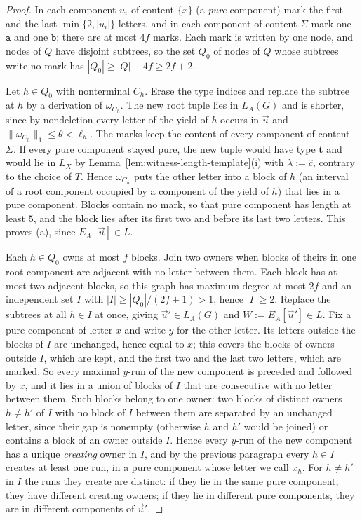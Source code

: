\documentclass[11pt]{article}
\numberwithin{equation}{section}
\theoremstyle{plain}
\theoremstyle{definition}
\theoremstyle{remark}
\newcommand{\tuple}[1]{\vec{#1}}
\theoremstyle{plain}
\begin{document}
\begin{proof}
In each component $u_i$ of content $\{x\}$ (a \emph{pure} component) mark the
first and the last $\min\{2,|u_i|\}$ letters, and in each component of content
$\Sigma$ mark one $\mathtt a$ and one $\mathtt b$; there are at most $4f$ marks.
Each mark is written by one node, and nodes of $Q$ have disjoint subtrees, so
the set $Q_0$ of nodes of $Q$ whose subtrees write no mark has
$|Q_0|\ge|Q|-4f\ge2f+2$.

Let $h\in Q_0$ with nonterminal $C_h$.  Erase the type indices and replace the
subtree at $h$ by a derivation of $\omega_{C_h}$.  The new root tuple lies in
$L_A(G)$ and is shorter, since by nondeletion every letter of the yield of $h$
occurs in $\tuple u$ and $\|\omega_{C_h}\|_1\le\theta<\ell_h$.  The marks keep the
content of every component of content $\Sigma$.  If every pure component stayed
pure, the new tuple would have type $\mathbf t$ and would lie in $L_X$ by
Lemma~\ref{lem:witness-length-template}(i) with $\lambda:=\widehat c$, contrary to
the choice of $T$.  Hence $\omega_{C_h}$ puts the other letter into a block of $h$
(an interval of a root component occupied by a component of the yield of $h$)
that lies in a pure component.  Blocks contain no mark, so that pure component
has length at least $5$, and the block lies after its first two and before its
last two letters.  This proves (a), since $E_A[\tuple u]\in L$.

Each $h\in Q_0$ owns at most $f$ blocks.  Join two owners when blocks of theirs in
one root component are adjacent with no letter between them.  Each block has at
most two adjacent blocks, so this graph has maximum degree at most $2f$ and an
independent set $I$ with $|I|\ge|Q_0|/(2f+1)>1$, hence $|I|\ge2$.  Replace the subtrees at
all $h\in I$ at once, giving $\tuple u'\in L_A(G)$ and $W:=E_A[\tuple u']\in L$.
Fix a pure component of letter $x$ and write $y$ for the other letter.  Its
letters outside the blocks of $I$ are unchanged, hence equal to $x$; this
covers the blocks of owners outside $I$, which are kept, and the first two and
the last two letters, which are marked.  So every maximal $y$-run of the new
component is preceded and followed by $x$, and it lies in a union of blocks of
$I$ that are consecutive with no letter between them.  Such blocks belong to one
owner: two blocks of distinct owners $h\ne h'$ of $I$ with no block of $I$
between them are separated by an unchanged letter, since their gap is nonempty
(otherwise $h$ and $h'$ would be joined) or contains a block of an owner outside
$I$.  Hence every $y$-run of the new component has a unique \emph{creating}
owner in $I$, and by the previous paragraph every $h\in I$ creates at least one
run, in a pure component whose letter we call $x_h$.  For $h\ne h'$ in $I$ the
runs they create are distinct: if they lie in the same pure component, they have
different creating owners; if they lie in different pure components, they are
in different components of $\tuple u'$.


\end{proof}
\end{document}
